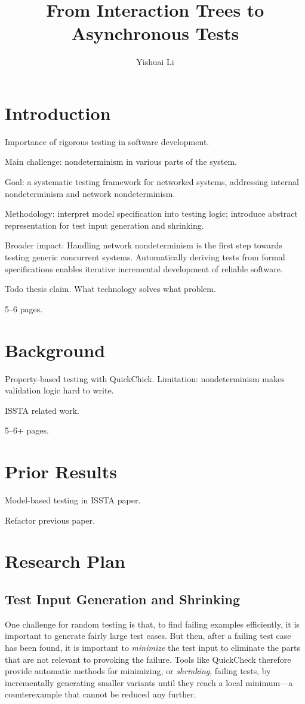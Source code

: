 \documentclass{article}
\title{From Interaction Trees to Asynchronous Tests}
\author{Yishuai Li}
\theoremstyle{definition}
\begin{document}
\maketitle
\section{Introduction}
Importance of rigorous testing in software development.

Main challenge: nondeterminism in various parts of the system.

Goal: a systematic testing framework for networked systems, addressing internal
nondeterminism and network nondeterminism.

Methodology: interpret model specification into testing logic; introduce
abstract representation for test input generation and shrinking.

Broader impact: Handling network nondeterminism is the first step towards
testing generic concurrent systems.  Automatically deriving tests from formal
specifications enables iterative incremental development of reliable software.

Todo thesis claim.  What technology solves what problem.

5--6 pages.

\section{Background}
Property-based testing with QuickChick.  Limitation: nondeterminism makes
validation logic hard to write.

ISSTA related work.

5--6+ pages.

\section{Prior Results}
Model-based testing in ISSTA paper.

Refactor previous paper.

\section{Research Plan}
\subsection{Test Input Generation and Shrinking}

One challenge for random testing is that, to find failing examples efficiently,
it is important to generate fairly large test cases.  But then, after a failing
test case has been found, it is important to \textit{minimize} the test input to
eliminate the parts that are not relevant to provoking the failure.  Tools like
QuickCheck therefore provide automatic methods for minimizing, or {\em
  shrinking}, failing tests, by incrementally generating smaller variants until
they reach a local minimum---a counterexample that cannot be reduced any
further.
\end{document}
